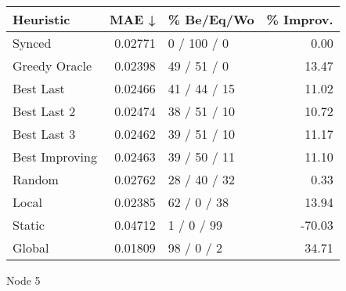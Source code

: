 \begin{tabular}{lrlr}
\toprule
\textbf{Heuristic} & \textbf{MAE ↓} & \textbf{\% Be/Eq/Wo} & \textbf{\% Improv.} \\
\midrule
            Synced &        0.02771 &          0 / 100 / 0 &                0.00 \\
     Greedy Oracle &        0.02398 &          49 / 51 / 0 &               13.47 \\
         Best Last &        0.02466 &         41 / 44 / 15 &               11.02 \\
       Best Last 2 &        0.02474 &         38 / 51 / 10 &               10.72 \\
       Best Last 3 &        0.02462 &         39 / 51 / 10 &               11.17 \\
    Best Improving &        0.02463 &         39 / 50 / 11 &               11.10 \\
            Random &        0.02762 &         28 / 40 / 32 &                0.33 \\
             Local &        0.02385 &          62 / 0 / 38 &               13.94 \\
            Static &        0.04712 &           1 / 0 / 99 &              -70.03 \\
            Global &        0.01809 &           98 / 0 / 2 &               34.71 \\
\bottomrule
\end{tabular}
\caption{Node 5}
\label{tab:non_lr05_le1_bs4_5}
